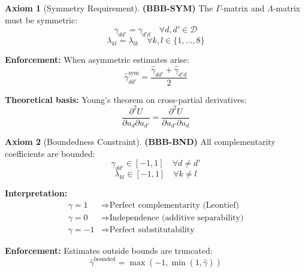 \documentclass[11pt,a4paper]{article}
\theoremstyle{definition}
\newtheorem{axiom}{Axiom}[section]
\begin{document}
\begin{axiom}[Symmetry Requirement]
\label{ax:bbb-sym}
\textbf{(BBB-SYM)} The $\Gamma$-matrix and $\Lambda$-matrix must be symmetric:
\begin{equation}
\gamma_{dd'} = \gamma_{d'd} \quad \forall d, d' \in \mathcal{D}
\end{equation}
\begin{equation}
\lambda_{kl} = \lambda_{lk} \quad \forall k, l \in \{1, \ldots, 8\}
\end{equation}

\textbf{Enforcement:} When asymmetric estimates arise:
\begin{equation}
\hat{\gamma}_{dd'}^{\text{sym}} = \frac{\hat{\gamma}_{dd'} + \hat{\gamma}_{d'd}}{2}
\end{equation}

\textbf{Theoretical basis:} Young's theorem on cross-partial derivatives:
\begin{equation}
\frac{\partial^2 U}{\partial u_d \partial u_{d'}} = \frac{\partial^2 U}{\partial u_{d'} \partial u_d}
\end{equation}
\end{axiom}

\begin{axiom}[Boundedness Constraint]
\label{ax:bbb-bnd}
\textbf{(BBB-BND)} All complementarity coefficients are bounded:
\begin{equation}
\gamma_{dd'} \in [-1, 1] \quad \forall d \neq d'
\end{equation}
\begin{equation}
\lambda_{kl} \in [-1, 1] \quad \forall k \neq l
\end{equation}

\textbf{Interpretation:}
\begin{align}
\gamma = 1 &\Rightarrow \text{Perfect complementarity (Leontief)} \\
\gamma = 0 &\Rightarrow \text{Independence (additive separability)} \\
\gamma = -1 &\Rightarrow \text{Perfect substitutability}
\end{align}

\textbf{Enforcement:} Estimates outside bounds are truncated:
\begin{equation}
\hat{\gamma}^{\text{bounded}} = \max(-1, \min(1, \hat{\gamma}))
\end{equation}
\end{axiom}

\end{document}
